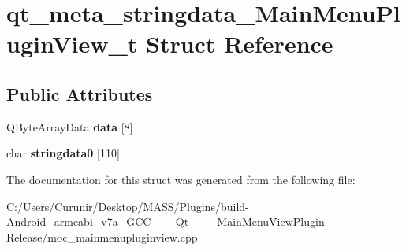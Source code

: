 \hypertarget{structqt__meta__stringdata___main_menu_plugin_view__t}{}\section{qt\+\_\+meta\+\_\+stringdata\+\_\+\+Main\+Menu\+Plugin\+View\+\_\+t Struct Reference}
\label{structqt__meta__stringdata___main_menu_plugin_view__t}
\subsection*{Public Attributes}
\begin{DoxyCompactItemize}
\item 
\mbox{\label{structqt__meta__stringdata___main_menu_plugin_view__t_ac70f82887e71e21309a9b80f0e3ceefc}} 
Q\+Byte\+Array\+Data {\bfseries data} \mbox{[}8\mbox{]}
\item 
\mbox{\label{structqt__meta__stringdata___main_menu_plugin_view__t_a79971d790269f5b9e01072043dff36be}} 
char {\bfseries stringdata0} \mbox{[}110\mbox{]}
\end{DoxyCompactItemize}


The documentation for this struct was generated from the following file\+:\begin{DoxyCompactItemize}
\item 
C\+:/\+Users/\+Curunir/\+Desktop/\+M\+A\+S\+S/\+Plugins/build-\/\+Android\+\_\+armeabi\+\_\+v7a\+\_\+\+G\+C\+C\+\_\+\_\+\_\+\+Qt\+\_\+\_\+\_-\/\+Main\+Menu\+View\+Plugin-\/\+Release/moc\+\_\+mainmenupluginview.\+cpp\end{DoxyCompactItemize}
